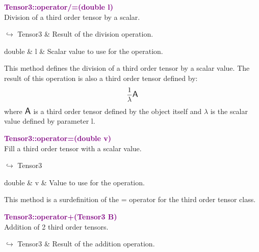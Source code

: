 \textcolor{purple}{\textbf{Tensor3::operator/=(double l)}}\label{Tensor3::operator/=(double l)}\\
Division of a third order tensor by a scalar.\vspace*{-0.5em}
\begin{tcolorbox}[grow to left by=-1cm, width=\textwidth-1cm,myArgs,tabularx={l|R}]
$\hookrightarrow$ Tensor3 & Result of the division operation.
\end{tcolorbox}

\begin{tcolorbox}[width=\textwidth,myArgs,tabularx={ll|R}]
double & l & Scalar value to use for the operation.
\end{tcolorbox}

This method defines the division of a third order tensor by a scalar value.
The result of this operation is also a third order tensor defined by:
\begin{equation*}
\frac{1}{\lambda} \mbox{\large\ensuremath{\mathsf{A}}}
\end{equation*}
where $\mbox{\large\ensuremath{\mathsf{A}}}$ is a third order tensor defined by the object itself and $\lambda$ is the scalar value defined by parameter l.

\textcolor{purple}{\textbf{Tensor3::operator=(double v)}}\label{Tensor3::operator=(double v)}\\
Fill a third order tensor with a scalar value.\vspace*{-0.5em}
\begin{tcolorbox}[grow to left by=-1cm, width=\textwidth-1cm,myArgs,tabularx={l|R}]
$\hookrightarrow$ Tensor3
\end{tcolorbox}

\begin{tcolorbox}[width=\textwidth,myArgs,tabularx={ll|R}]
double & v & Value to use for the operation.
\end{tcolorbox}

This method is a surdefinition of the = operator for the third order tensor class.

\textcolor{purple}{\textbf{Tensor3::operator+(Tensor3 B)}}\label{Tensor3::operator+(Tensor3 B)}\\
Addition of 2 third order tensors.\vspace*{-0.5em}
\begin{tcolorbox}[grow to left by=-1cm, width=\textwidth-1cm,myArgs,tabularx={l|R}]
$\hookrightarrow$ Tensor3 & Result of the addition operation.
\end{tcolorbox}

